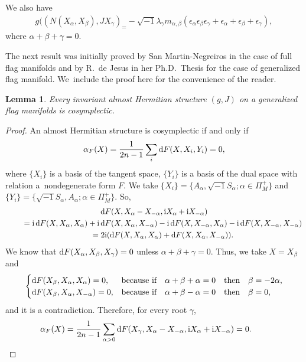 \documentclass[10pt,a4paper]{amsart}
\numberwithin{equation}{section}
\newtheorem{Lemma}[Theorem]{Lemma}
\begin{document}
We also have
\begin{gather*}
g((N(X_{\alpha},X_{\beta}),J X_{\gamma})_=-\sqrt{-1}\lambda_{\gamma}m_{\alpha,\beta}(\epsilon_{\alpha}\epsilon_{\beta}\epsilon_{\gamma}
+\epsilon_{\alpha}+\epsilon_{\beta}+\epsilon_{\gamma}),
\end{gather*}
where $\alpha+\beta+\gamma=0$.

The next result was initially proved by San Martin-Negreiros \cite{sn} in the case of full flag manifolds and by R.~de Jesus in her Ph.D.~Thesis for the case of generalized flag manifold. We~include the proof here for the convenience of the reader.
\begin{Lemma}\label{lema-sm-neg}
Every invariant almost Hermitian structure $(g,J)$ on a generalized flag manifolds is cosymplectic.
\end{Lemma}
\begin{proof}
An almost Hermitian structure is cosymplectic if and only if
\begin{gather*}
\alpha_{F}(X)=\dfrac{1}{2n-1}\sum_{i}{\rm d}F(X,X_{i},Y_{i})=0,
\end{gather*}
where $\{X_{i}\}$ is a basis of the tangent space, $\{Y_{i}\}$ is a basis of the dual space with relation a~nondegenerate form $F$. We take $\{X_{i}\}=\big\{A_{\alpha}, \sqrt{-1}S_{\alpha};\alpha\in \Pi^{+}_M \big\}$ and $\{Y_{i}\}=\big\{\sqrt{-1}S_{\alpha}, A_{\alpha};\allowbreak \alpha\in \Pi^{+}_M \big\} $. So,
\begin{gather*}
{\rm d}F(X,X_{\alpha}-X_{-\alpha},{\rm i}X_{\alpha}+{\rm i}X_{-\alpha})
\\ \qquad
{}={\rm i}\,{\rm d}F(X,X_{\alpha},X_{\alpha})+{\rm i}\,{\rm d}F(X,X_{\alpha},X_{-\alpha})
-{\rm i}\,{\rm d}F(X,X_{-\alpha},X_{\alpha})-{\rm i}\,{\rm d}F(X,X_{-\alpha},X_{-\alpha})
\\ \qquad
{}=2{\rm i}({\rm d}F(X,X_{\alpha},X_{\alpha})+{\rm d}F(X,X_{\alpha},X_{-\alpha})).
\end{gather*}
We know that ${\rm d}F(X_{\alpha},X_{\beta}, X_{\gamma})=0$ unless $\alpha+\beta+\gamma=0$.
Thus, we take $X=X_{\beta}$ and
\begin{gather*}
\begin{cases}
{\rm d}F(X_{\beta},X_{\alpha}, X_{\alpha})=0,&\text{because if} \quad\alpha+\beta+\alpha=0 \quad \text{then} \quad \beta=-2\alpha,
\\
{\rm d}F(X_{\beta},X_{\alpha}, X_{-\alpha})=0,&\text{because if}\quad\alpha+\beta-\alpha=0 \quad \text{then} \quad \beta=0,
\end{cases}
\end{gather*}
and it is a contradiction.
Therefore, for every root $\gamma$,
\begin{gather*}
\alpha_{F}(X)=\dfrac{1}{2n-1}\sum_{\alpha>0}{\rm d}F(X_{\gamma},X_{\alpha}-X_{-\alpha},{\rm i}X_{\alpha}+{\rm i}X_{-\alpha})=0.\tag*{\qed}
\end{gather*}
\renewcommand{\qed}{}
\end{proof}
\end{document}
